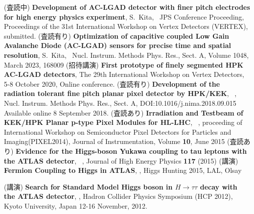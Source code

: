 \renewcommand{\refname}{研究業績リスト}
\begin{thebibliography}{99}
    (査読中) {\bf Development of AC-LGAD detector with finer pitch electrodes for high energy physics experiment}, S.~Kita, \me ~\etal  JPS Conference Proceeding, Proceedings of the 31st International Workshop on Vertex Detectors (VERTEX), submitted.
    (査読有り) {\bf Optimization of capacitive coupled Low Gain Avalanche Diode (AC-LGAD) sensors for precise time and spatial resolution}, S.~Kita, \me ~\etal  Nucl. Instrum. Methods Phys. Res., Sect. A,  Volume 1048, March 2023, 168009
    (招待講演) {\bf First prototype of finely segmented HPK AC-LGAD detectors}, The 29th International Workshop on Vertex Detectors, 5-8 October 2020, Online conference.
           (査読有り) {\bf Development of the radiation tolerant fine pitch planar pixel detector by HPK/KEK}, \me ~\etal , Nucl. Instrum. Methods Phys. Res., Sect. A, DOI:10.1016/j.nima.2018.09.015 Available online 8 September 2018.
           (査読あり) {\bf Irradiation and Testbeam of KEK/HPK Planar p-type Pixel Modules for HL-LHC}, \me ~\etal, proceeding of International Workshop on Semiconductor Pixel Detectors for Particles and Imaging(PIXEL2014), Journal of Instrumentation, Volume {\bf 10}, June 2015 
           (査読あり) {\bf Evidence for the Higgs-boson Yukawa coupling to tau leptons with the ATLAS detector}, \me ~, Journal of High Energy Physics {\bf 117} (2015)
          (講演) {\bf Fermion Coupling to Higgs in ATLAS}, \me, Higgs Hunting 2015, LAL, Olsay
        
         (講演) {\bf Search for Standard Model Higgs boson in $H\to\tau\tau$ decay with the ATLAS detector}, \me, Hadron Collider Physics Symposium (HCP 2012), Kyoto University, Japan 12-16 November, 2012.  
          

\end{thebibliography}
